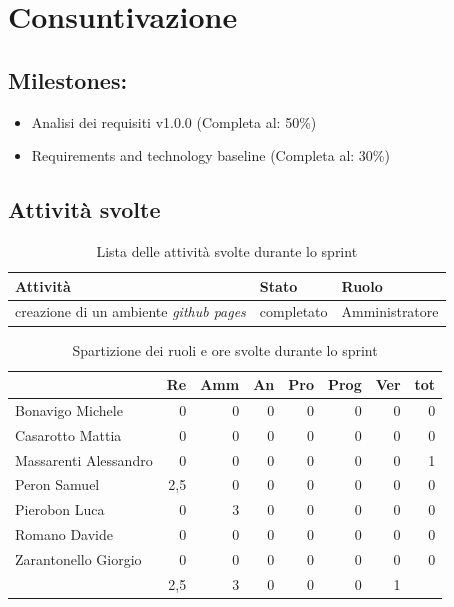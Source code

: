\section{Consuntivazione}

\subsection{Milestones:}
\begin{itemize}
    \item Analisi dei requisiti v1.0.0 (Completa al: 50\%)
    \item Requirements and technology baseline (Completa al: 30\%)
\end{itemize}

\subsection{Attività svolte}


\begin{table}[ht]
    \begin{tabularx}{\textwidth}{X l l}
        
        \rowcolor{gray!30} \textbf{Attività} & \textbf{Stato} & \textbf{Ruolo}\\
        
        \hline
        creazione di un ambiente \textit{github pages} & completato & Amministratore\\
    \end{tabularx}
    \caption{Lista delle attività svolte durante lo sprint}
\end{table}


\begin{table}[ht]
    \begin{tabularx}{\linewidth}{X|rrrrrrr}
    \rowcolor{gray!30}& Re & Amm & An & Pro & Prog & Ver & tot \\
    \hline
    Bonavigo Michele                        & 0 & 0 & 0 & 0 & 0 & 0  & 0 \\
    \rowcolor{gray!10}Casarotto Mattia      & 0 & 0 & 0 & 0 & 0 & 0  & 0 \\
    Massarenti Alessandro                   & 0 & 0 & 0 & 0 & 0 & 0  & 1 \\
    \rowcolor{gray!10}Peron Samuel          & 2,5 & 0 & 0 & 0 & 0 & 0 & 0\\
    Pierobon Luca                           & 0 & 3 & 0 & 0 & 0 & 0 & 0\\
    \rowcolor{gray!10}Romano Davide         & 0 & 0 & 0 & 0 & 0 & 0 & 0\\
    Zarantonello Giorgio                    & 0 & 0 & 0 & 0 & 0 & 0 & 0 \\
    \hline                                  & 2,5 & 3 & 0 & 0 & 0 & 1 & 
    \end{tabularx}
    \caption{\label{ruoli-persone}Spartizione dei ruoli e ore svolte durante lo sprint}
\end{table}

